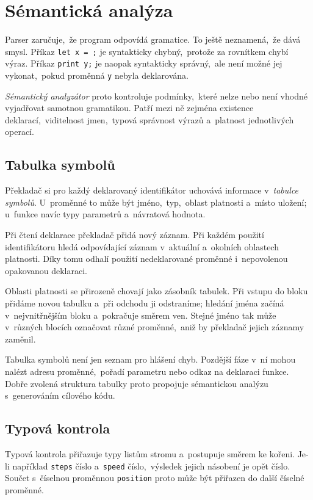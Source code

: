 \section{Sémantická analýza}\label{sec:semanticka-analyza}

Parser zaručuje,~že program odpovídá gramatice. To ještě neznamená,~že dává smysl. Příkaz \texttt{let x = ;} je syntakticky chybný,~protože za rovnítkem chybí výraz. Příkaz \texttt{print y;} je naopak syntakticky správný,~ale není možné jej vykonat,~pokud proměnná \texttt{y} nebyla deklarována.

\emph{Sémantický analyzátor} proto kontroluje podmínky,~které nelze nebo není vhodné vyjadřovat samotnou gramatikou. Patří mezi ně zejména existence deklarací,~viditelnost jmen,~typová správnost výrazů a~platnost jednotlivých operací.

\subsection{Tabulka symbolů}

Překladač si pro každý deklarovaný identifikátor uchovává informace v~\emph{tabulce symbolů}. U~proměnné to může být jméno,~typ,~oblast platnosti a~místo uložení; u~funkce navíc typy parametrů a~návratová hodnota.

Při čtení deklarace překladač přidá nový záznam. Při každém použití identifikátoru hledá odpovídající záznam v~aktuální a~okolních oblastech platnosti. Díky tomu odhalí použití nedeklarované proměnné i~nepovolenou opakovanou deklaraci.

Oblasti platnosti se přirozeně chovají jako zásobník tabulek. Při vstupu do bloku přidáme novou tabulku a~při odchodu ji odstraníme; hledání jména začíná v~nejvnitřnějším bloku a~pokračuje směrem ven. Stejné jméno tak může v~různých blocích označovat různé proměnné,~aniž by překladač jejich záznamy zaměnil.

Tabulka symbolů není jen seznam pro hlášení chyb. Pozdější fáze v~ní mohou nalézt adresu proměnné,~pořadí parametru nebo odkaz na deklaraci funkce. Dobře zvolená struktura tabulky proto propojuje sémantickou analýzu s~generováním cílového kódu.

\subsection{Typová kontrola}

Typová kontrola přiřazuje typy listům stromu a~postupuje směrem ke kořeni. Je-li například \texttt{steps} číslo a~\texttt{speed} číslo,~výsledek jejich násobení je opět číslo. Součet s~číselnou proměnnou \texttt{position} proto může být přiřazen do další číselné proměnné.

